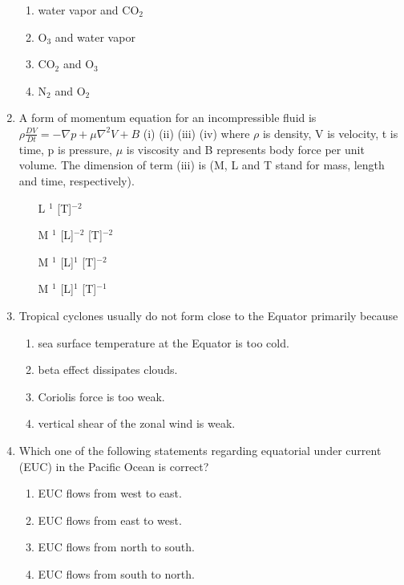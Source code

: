 \documentclass[a4paper,10pt]{article}
\begin{document}
\begin{enumerate}
\hfill{}
\begin{enumerate}
    \item water vapor and CO$_2$
    \item O$_3$ and water vapor
    \item CO$_2$ and O$_3$
    \item N$_2$ and O$_2$
\end{enumerate}

\item A form of momentum equation for an incompressible fluid is
$\rho \frac{DV}{Dt} = -\nabla p + \mu \nabla^2 V + B$
(i) \hspace{1cm} (ii) \hspace{1cm} (iii) \hspace{1cm} (iv)
where $\rho$ is density, V is velocity, t is time, p is pressure, $\mu$ is viscosity and B represents body force per unit volume. The dimension of term (iii) is (M, L and T stand for mass, length and time, respectively).

\hfill{}
\begin{enumerate}
    \item [L]$^1$ [T]$^{-2}$
    \item [M]$^1$ [L]$^{-2}$ [T]$^{-2}$
    \item [M]$^1$ [L]$^1$ [T]$^{-2}$
    \item [M]$^1$ [L]$^1$ [T]$^{-1}$
\end{enumerate}

\item Tropical cyclones usually do not form close to the Equator primarily because

\hfill{}
\begin{enumerate}
    \item sea surface temperature at the Equator is too cold.
    \item beta effect dissipates clouds.
    \item Coriolis force is too weak.
    \item vertical shear of the zonal wind is weak.
\end{enumerate}

\item Which one of the following statements regarding equatorial under current (EUC) in the Pacific Ocean is correct?

\hfill{}
\begin{enumerate}
    \item EUC flows from west to east.
    \item EUC flows from east to west.
    \item EUC flows from north to south.
    \item EUC flows from south to north.
\end{enumerate}


\end{enumerate}
\end{document}
